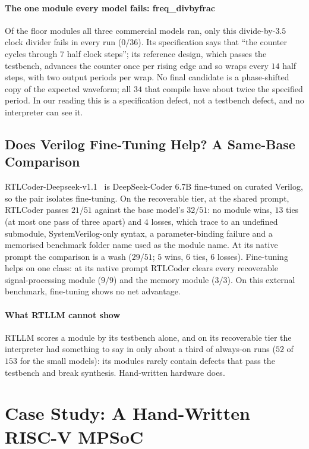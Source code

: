 \documentclass[11pt]{article}
\begin{document}
\paragraph{The one module every model fails: freq\_divbyfrac} Of the floor
modules all three commercial models ran, only this divide-by-$3.5$ clock divider
fails in every run ($0/36$). Its specification says that ``the counter cycles
through 7 half clock steps''; its reference design, which passes the testbench,
advances the counter once per rising edge and so wraps every $14$ half steps,
with two output periods per wrap. No final candidate is a phase-shifted copy of
the expected waveform; all $34$ that compile have about twice the specified
period. In our reading this is a specification defect, not a testbench defect,
and no interpreter can see it.

\subsection{Does Verilog Fine-Tuning Help? A Same-Base Comparison}
\label{sec:finetune}

RTLCoder-Deepseek-v1.1~\cite{rtlcoder,rtlcoder_hf} is DeepSeek-Coder 6.7B
fine-tuned on curated Verilog, so the pair isolates fine-tuning. On the
recoverable tier, at the shared prompt, RTLCoder passes $21/51$ against the base
model's $32/51$: no module wins, $13$ ties (at most one pass of three apart) and
$4$ losses, which trace to an undefined submodule, SystemVerilog-only syntax, a
parameter-binding failure and a memorised benchmark folder name used as the
module name. At its native prompt the comparison is a wash ($29/51$; $5$ wins,
$6$ ties, $6$ losses). Fine-tuning helps on one class: at its native prompt
RTLCoder clears every recoverable signal-processing module ($9/9$) and the
memory module ($3/3$). On this external benchmark, fine-tuning shows no net
advantage.

\paragraph{What RTLLM cannot show} RTLLM scores a module by its testbench alone,
and on its recoverable tier the interpreter had something to say in only about a
third of always-on runs ($52$ of $153$ for the small models): its modules rarely
contain defects that pass the testbench and break synthesis. Hand-written
hardware does.

\section{Case Study: A Hand-Written RISC-V MPSoC}
\label{sec:mpsoc}
\end{document}
